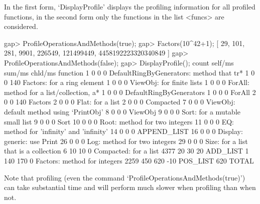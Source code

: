 In the first form, `DisplayProfile' displays the profiling information
for all profiled functions,
in the second form only the functions in the list <funcs> are
considered.

\begintt
gap> ProfileOperationsAndMethods(true);
gap> Factors(10^42+1);
[ 29, 101, 281, 9901, 226549, 121499449, 4458192223320340849 ]
gap> ProfileOperationsAndMethods(false);
gap> DisplayProfile();
  count  self/ms   sum/ms  chld/ms  function                                  
      1        0        0        0  DefaultRingByGenerators: method that tr*  
      1        0        0      140  Factors: for a ring element               
      1        0        0        0  ViewObj: for finite lists                 
      1        0        0        0  ForAll: method for a list/collection, a*  
      1        0        0        0  DefaultRingByGenerators                   
      1        0        0        0  ForAll                                    
      2        0        0      140  Factors                                   
      2        0        0        0  Flat: for a list                          
      2        0        0        0  Compacted                                 
      7        0        0        0  ViewObj: default method using `PrintObj'  
      8        0        0        0  ViewObj                                   
      9        0        0        0  Sort: for a mutable small list            
      9        0        0        0  Sort                                      
     10        0        0        0  Root: method for two integers             
     11        0        0        0  EQ: method for 'infinity' and 'infinity'  
     14        0        0        0  APPEND_LIST                               
     16        0        0        0  Display: generic: use Print               
     26        0        0        0  Log: method for two integers              
     29        0        0        0  Size: for a list that is a collection     
      6       10       10        0  Compacted: for a list                     
   4377       20       30       20  ADD_LIST                                  
      1      140      170        0  Factors: method for integers              
   2259      450      620      -10  POS_LIST                                  
             620                    TOTAL                                     
\endtt


Note that profiling (even the command `ProfileOperationsAndMethods(true)')
can take substantial time and {\GAP} will perform much slower when profiling
than when not.



